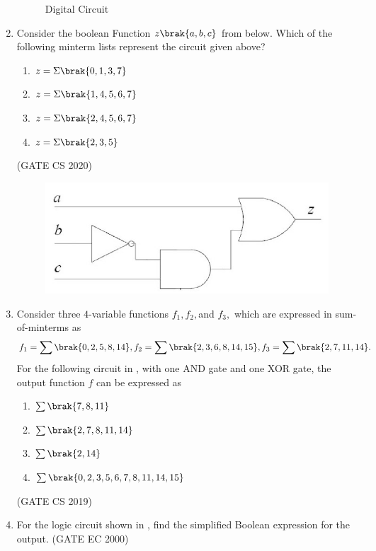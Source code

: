 \begin{enumerate}[label=\arabic*.,ref=\theenumi]
\begin{figure}[H]
    \caption{Digital Circuit}
    \label{fig:Multiplexer}
\end{figure}
%
\item Consider the boolean Function $z\brak{a,b,c}$ from 
			 below.
		Which of the following minterm lists represent the circuit given above?
	\begin{enumerate}
		\item $z=\Sigma\brak{0,1,3,7}$
		\item $z=\Sigma\brak{1,4,5,6,7}$
		\item $z=\Sigma\brak{2,4,5,6,7}$
		\item $z=\Sigma\brak{2,3,5}$
	\end{enumerate}	   
	\hfill{(GATE CS 2020)}
%	
		\begin{figure}[H]
			\centering
			\includegraphics[width=0.5\columnwidth]{figs/203.png}
			\caption{}
			\label{fig:203}
		\end{figure}
%
\item Consider three $4$-variable functions $f_1, f_2, $and $f_3,$ which are expressed in sum-of-minterms as 
$$f_1 = \sum\brak{0,2,5,8,14}, f_2=\sum\brak{2,3,6,8,14,15}, f_3 = \sum\brak{2,7,11,14}.$$ For the following circuit 
	in 
	,
	with one AND gate and one XOR gate, the output function $f$ can be expressed as
		\begin{enumerate}
		\item $\sum\brak{7,8,11}$
		\item $\sum\brak{2,7,8,11,14}$
		\item $\sum\brak{2,14}$
		\item $\sum\brak{0,2,3,5,6,7,8,11,14,15}$
		\end{enumerate}
%
	\hfill(GATE CS 2019)
	\begin{figure}[H]
		 \centering
		 \resizebox{0.5\columnwidth}{!}{%
			
			}
                 \caption{}
	\label{fig:GATE-CS2019,30}
	\end{figure}
\item For the logic circuit shown in , find the simplified Boolean expression for the output. 
\label{prob:2000/gate/ec/2/7}
\hfill (GATE EC 2000)
\begin{figure}[H]

\end{figure}
\end{enumerate}
